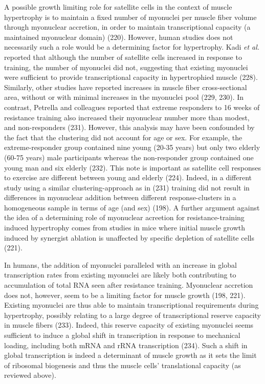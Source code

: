 \documentclass[twoside,10pt]{gihclass} %
\begin{document}
A possible growth limiting role for satellite cells in the context of muscle hypertrophy is to maintain a fixed number of myonuclei per muscle fiber volume through myonuclear accretion, in order to maintain transcriptional capacity (a maintained myonuclear domain)
(220).
However, human studies does not necessarily such a role would be a determining factor for hypertrophy.
Kadi \emph{et al.} reported that although the number of satellite cells increased in response to training, the number of myonuclei did not,
suggesting that existing myonuclei were sufficient to provide transcriptional capacity in hypertrophied muscle
(228).
Similarly, other studies have reported increases in muscle fiber cross-sectional area, without or with minimal increases in the myonuclei pool
(229, 230).
In contrast, Petrella and colleagues reported that extreme responders to 16 weeks of resistance training also increased their myonuclear number more than modest, and non-responders
(231).
However, this analysis may have been confounded by the fact that the clustering did not account for age or sex. For example, the extreme-responder group contained nine young (20-35 years) but only two elderly (60-75 years) male participants whereas the non-responder group contained one young man and six elderly
(232).
This note is important as satellite cell responses to exercise are different between young and elderly
(224).
Indeed, in a different study using a similar clustering-approach as in (231) training did not result in differences in myonuclear addition between different response-clusters in a homogeneous sample in terms of age (and sex)
(198).
A further argument against the idea of a determining role of myonuclear acreetion for resistance-training induced hypertrophy comes from studies in mice where initial muscle growth induced by synergist ablation is unaffected by specific depletion of satellite cells
(221).

In humans, the addition of myonuclei paralleled with an increase in global transcription rates from existing myonuclei are likely both contributing to accumulation of total RNA seen after resistance training.
Myonuclear accretion does not, however, seem to be a limiting factor for muscle growth
(198, 221).
Existing myonuclei are thus able to maintain transcriptional requirements during hypertrophy, possibly relating to a large degree of transcriptional reserve capacity in muscle fibers
(233).
Indeed, this reserve capacity of existing myonuclei seems sufficient to induce a global shift in transcription in response to mechanical loading, including both mRNA and rRNA transcription
(234).
Such a shift in global transcription is indeed a determinant of muscle growth as it sets the limit of ribosomal biogenesis and thus the muscle cells' translational capacity (as reviewed above).
\end{document}

